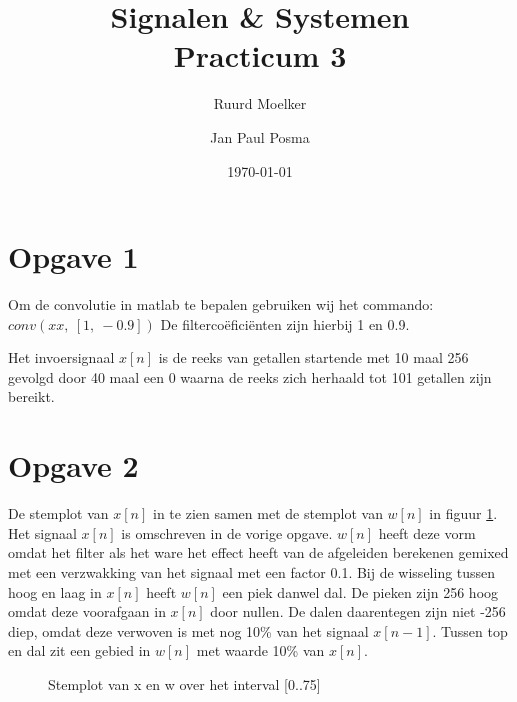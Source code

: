 \documentclass{article}
\author{Ruurd Moelker \and Jan Paul Posma}
\date{\today}
\title{Signalen \& Systemen \\Practicum 3}
\begin{document}
\maketitle

\section{Opgave 1}
Om de convolutie in matlab te bepalen gebruiken wij het commando:
$conv(xx,~[1,~-0.9])$
De filterco\"efici\"enten zijn hierbij 1 en 0.9.

Het invoersignaal $x[n]$ is de reeks van getallen startende met 10 maal 256 gevolgd door 40 maal een 0 waarna de reeks zich herhaald tot 101 getallen zijn bereikt.

\section{Opgave 2}
De stemplot van $x[n]$ in te zien samen met de stemplot van $w[n]$ in figuur \ref{fig_opgave2}. Het signaal $x[n]$ is omschreven in de vorige opgave. $w[n]$ heeft deze vorm omdat het filter als het ware het effect heeft van de afgeleiden berekenen gemixed met een verzwakking van het signaal met een factor 0.1. Bij de wisseling tussen hoog en laag in $x[n]$ heeft $w[n]$ een piek danwel dal. De pieken zijn 256 hoog omdat deze voorafgaan in $x[n]$ door nullen. De dalen daarentegen zijn niet -256 diep, omdat deze verwoven is met nog 10\% van het signaal $x[n-1]$. Tussen top en dal zit een gebied in $w[n]$ met waarde 10\% van $x[n]$.

\begin{figure}[h]
  \centering
  \caption{Stemplot van x en w over het interval [0..75]}
  \label{fig_opgave2}
\end{figure}
\end{document}
